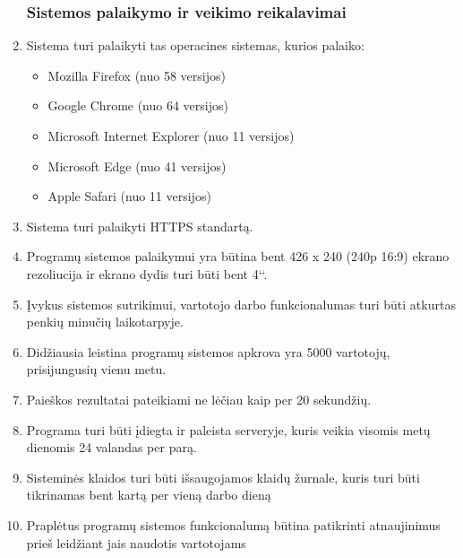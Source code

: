 \documentclass{VUMIFPSkursinis}
\begin{document}
\begin{enumerate}[label=\textbf{NFR\arabic*}.]
                	\subsubsection{Sistemos palaikymo ir veikimo reikalavimai}                	
                    	\item \label{operacines_sistemos} Sistema turi palaikyti tas operacines sistemas, kurios palaiko:
                    	\begin{itemize}
                        	\item Mozilla Firefox (nuo 58 versijos)
                        	\item Google Chrome (nuo 64 versijos)
                        	\item Microsoft Internet Explorer (nuo 11 versijos)
                        	\item Microsoft Edge (nuo 41 versijos)
                       	 	\item Apple Safari (nuo 11 versijos)
                    	\end{itemize}
                    	\item Sistema turi palaikyti HTTPS standartą.
                    	\item Programų sistemos palaikymui yra būtina bent 426 x 240 (240p 16:9) ekrano rezoliucija ir ekrano dydis turi būti bent 4‘‘.
                    	\item Įvykus sistemos sutrikimui, vartotojo darbo funkcionalumas turi būti atkurtas penkių minučių laikotarpyje.
                   	 	\item Didžiausia leistina programų sistemos apkrova yra 5000 vartotojų, prisijungusių vienu metu.
                    	\item Paieškos rezultatai pateikiami ne lėčiau kaip per 20 sekundžių.
                    	\item Programa turi būti įdiegta ir paleista serveryje, kuris veikia visomis metų dienomis 24 valandas per parą.
                    	\item Sisteminės klaidos turi būti išsaugojamos klaidų žurnale, kuris turi būti tikrinamas bent kartą per vieną darbo dieną
                    	\item Praplėtus programų sistemos funkcionalumą būtina patikrinti atnaujinimus prieš leidžiant jais naudotis vartotojams

\end{enumerate}
\end{document}
